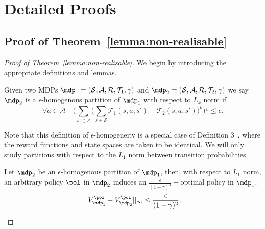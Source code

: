 \section{Detailed Proofs}

\subsection{Proof of Theorem~\ref{lemma:non-realisable}}\label{sec:proof_non_realisability}
\begin{proof}[Proof of Theorem~\ref{lemma:non-realisable}]
We begin by introducing the appropriate definitions and lemmas.  

\begin{definition}\label{def:eps_homo}
    Given two MDPs $\mdp_1 = (\mathcal{S}, \mathcal{A}, \mathcal{R}, \mathcal{T}_1, \gamma)$ and $\mdp_2 = (\mathcal{S}, \mathcal{A}, \mathcal{R}, \mathcal{T}_2, \gamma)$ we say $\mdp_2$ is a $\epsilon$-homogenous partition of $\mdp_1$ with respect to $L_k$ norm if
    \begin{equation}
        \forall a \in \mathcal{A} \quad \Big(\sum_{s' \in \mathcal{S}} \big(\sum_{s\in\mathcal{S}}\mathcal{T}_1(s, a, s')-\mathcal{T}_2(s, a, s')\big)^k\Big)^{\frac{1}{k}} \leq \epsilon.
    \end{equation}
\end{definition}

Note that this definition of $\epsilon$-homogeneity is a special case of Definition 3~\citep{even2003approximate}, where the reward functions and state spaces are taken to be identical. We will only study partitions with respect to the $L_1$ norm between transition probabilities.

\begin{lemma}\label{lemma:same_pol}
    Let $\mdp_2$ be an $\epsilon$-homogenous partition of $\mdp_1$, then, with respect to $L_1$ norm, an arbitrary policy $\pol$ in $\mdp_2$ induces an $\frac{\epsilon}{(1-\gamma)^2}-$optimal policy in $\mdp_1$.
    \begin{equation}
        ||V_{\mdp_1}^\pol-V_{\mdp_2}^\pol||_\infty \leq \frac{\epsilon}{(1-\gamma)^2}.
    \end{equation}
\end{lemma}


\end{proof}
